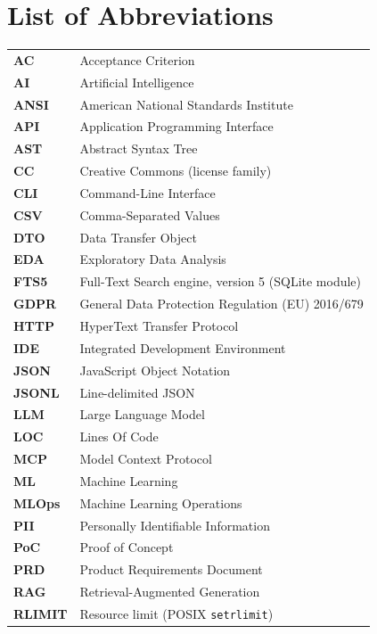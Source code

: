\chapter*{List of Abbreviations}
\thispagestyle{fancy}

\begin{table}[H]
\begin{tabular}{p{2.8cm}p{11.5cm}}
\textbf{AC} & Acceptance Criterion \\
\textbf{AI} & Artificial Intelligence \\
\textbf{ANSI} & American National Standards Institute \\
\textbf{API} & Application Programming Interface \\
\textbf{AST} & Abstract Syntax Tree \\
\textbf{CC} & Creative Commons (license family) \\
\textbf{CLI} & Command-Line Interface \\
\textbf{CSV} & Comma-Separated Values \\
\textbf{DTO} & Data Transfer Object \\
\textbf{EDA} & Exploratory Data Analysis \\
\textbf{FTS5} & Full-Text Search engine, version 5 (SQLite module) \\
\textbf{GDPR} & General Data Protection Regulation (EU) 2016/679 \\
\textbf{HTTP} & HyperText Transfer Protocol \\
\textbf{IDE} & Integrated Development Environment \\
\textbf{JSON} & JavaScript Object Notation \\
\textbf{JSONL} & Line-delimited JSON \\
\textbf{LLM} & Large Language Model \\
\textbf{LOC} & Lines Of Code \\
\textbf{MCP} & Model Context Protocol \\
\textbf{ML} & Machine Learning \\
\textbf{MLOps} & Machine Learning Operations \\
\textbf{PII} & Personally Identifiable Information \\
\textbf{PoC} & Proof of Concept \\
\textbf{PRD} & Product Requirements Document \\
\textbf{RAG} & Retrieval-Augmented Generation \\
\textbf{RLIMIT} & Resource limit (POSIX \texttt{setrlimit}) \\

\end{tabular}
\end{table}
